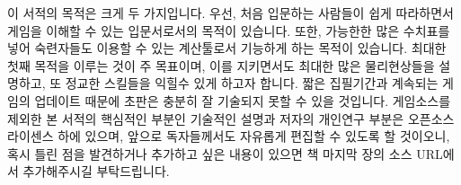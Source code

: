 이 서적의 목적은 크게 두 가지입니다. 
우선, 처음 입문하는 사람들이 쉽게 따라하면서 게임을 이해할 수 있는 입문서로서의 목적이 있습니다.
또한, 가능한한 많은 수치표를 넣어 숙련자들도 이용할 수 있는 계산툴로서 기능하게 하는 목적이 있습니다.
최대한 첫째 목적을 이루는 것이 주 목표이며, 이를 지키면서도 최대한 많은 물리현상들을 설명하고, 또 정교한 스킬들을 익힐수 있게 하고자 합니다.
짧은 집필기간과 계속되는 게임의 업데이트 때문에 초판은 충분히 잘 기술되지 못할 수 있을 것입니다.
게임소스를 제외한 본 서적의 핵심적인 부분인 기술적인 설명과 저자의 개인연구 부분은 오픈소스 라이센스 하에 있으며, 앞으로 독자들께서도 자유롭게 편집할 수 있도록 할 것이오니,
혹시 틀린 점을 발견하거나 추가하고 싶은 내용이 있으면 책 마지막 장의 소스 URL에서 추가해주시길 부탁드립니다.

